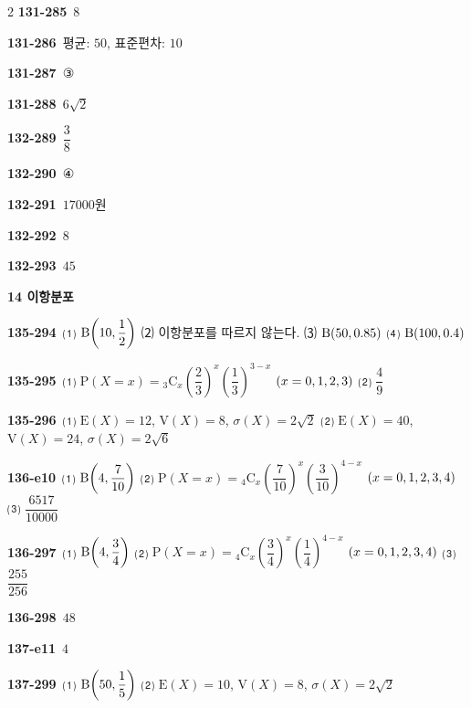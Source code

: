 \documentclass[10pt,a4paper]{article}
\begin{document}
\begin{multicols}{2}
\noindent\textbf{131-285}\ $8$\par
\noindent\textbf{131-286}\ 평균: $50$, 표준편차: $10$\par
\noindent\textbf{131-287}\ ③\par
\noindent\textbf{131-288}\ $6\sqrt{2}$\par
\noindent\textbf{132-289}\ $\dfrac{3}{8}$\par
\noindent\textbf{132-290}\ ④\par
\noindent\textbf{132-291}\ $17000$원\par
\noindent\textbf{132-292}\ $8$\par
\noindent\textbf{132-293}\ $45$\par
\noindent\textbf{14 이항분포}\par\smallskip
\noindent\textbf{135-294}\ ⑴ $\mathrm{B}\!\left(10{,}\mkern3mu\mathopen{}\dfrac{1}{2}\right)$ ⑵ 이항분포를 따르지 않는다. ⑶ $\mathrm{B}(50{,}\mkern3mu\mathopen{}0.85)$ ⑷ $\mathrm{B}(100{,}\mkern3mu\mathopen{}0.4)$\par
\noindent\textbf{135-295}\ ⑴ $\mathrm{P}(X=x)={}_3\mathrm{C}_x\left(\dfrac{2}{3}\right)^{x}\left(\dfrac{1}{3}\right)^{3-x}$ $(x=0{,}\mkern3mu\mathopen{}1{,}\mkern3mu\mathopen{}2{,}\mkern3mu\mathopen{}3)$ ⑵ $\dfrac{4}{9}$\par
\noindent\textbf{135-296}\ ⑴ $\mathrm{E}(X)=12$, $\mathrm{V}(X)=8$, $\sigma(X)=2\sqrt{2}$ ⑵ $\mathrm{E}(X)=40$, $\mathrm{V}(X)=24$, $\sigma(X)=2\sqrt{6}$\par
\noindent\textbf{136-e10}\ ⑴ $\mathrm{B}\!\left(4{,}\mkern3mu\mathopen{}\dfrac{7}{10}\right)$ ⑵ $\mathrm{P}(X=x)={}_4\mathrm{C}_x\left(\dfrac{7}{10}\right)^{x}\left(\dfrac{3}{10}\right)^{4-x}$ $(x=0{,}\mkern3mu\mathopen{}1{,}\mkern3mu\mathopen{}2{,}\mkern3mu\mathopen{}3{,}\mkern3mu\mathopen{}4)$ ⑶ $\dfrac{6517}{10000}$\par
\noindent\textbf{136-297}\ ⑴ $\mathrm{B}\!\left(4{,}\mkern3mu\mathopen{}\dfrac{3}{4}\right)$ ⑵ $\mathrm{P}(X=x)={}_4\mathrm{C}_x\left(\dfrac{3}{4}\right)^{x}\left(\dfrac{1}{4}\right)^{4-x}$ $(x=0{,}\mkern3mu\mathopen{}1{,}\mkern3mu\mathopen{}2{,}\mkern3mu\mathopen{}3{,}\mkern3mu\mathopen{}4)$ ⑶ $\dfrac{255}{256}$\par
\noindent\textbf{136-298}\ $48$\par
\noindent\textbf{137-e11}\ $4$\par
\noindent\textbf{137-299}\ ⑴ $\mathrm{B}\!\left(50{,}\mkern3mu\mathopen{}\dfrac{1}{5}\right)$ ⑵ $\mathrm{E}(X)=10$, $\mathrm{V}(X)=8$, $\sigma(X)=2\sqrt{2}$\par

\end{multicols}
\end{document}
